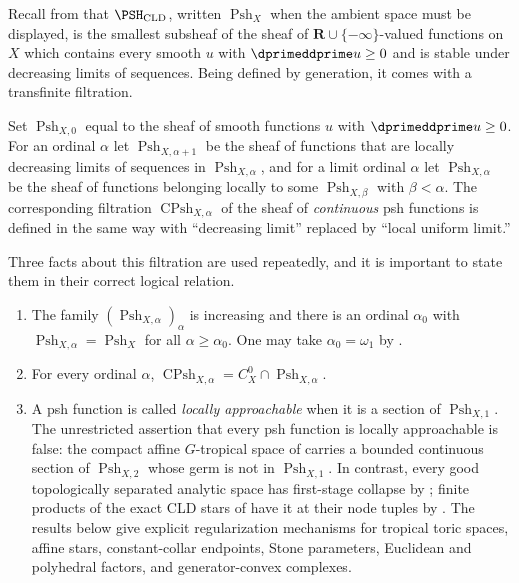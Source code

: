 Recall from  that $\PSH_{\mathrm{CLD}}$,
written $\operatorname{Psh}_X$ when the ambient space must be displayed, is
the smallest subsheaf of the sheaf of $\mathbf R\cup\{-\infty\}$-valued
functions on $X$ which contains every smooth $u$ with
$\dprimeddprime u\geq0$ and is stable under decreasing limits of sequences.
Being defined by generation, it comes with a transfinite filtration.

\begin{definition}
\label{def:ch16-psh-filtration}
Set $\operatorname{Psh}_{X,0}$ equal to the sheaf of smooth functions $u$
with $\dprimeddprime u\geq0$.  For an ordinal $\alpha$ let
$\operatorname{Psh}_{X,\alpha+1}$ be the sheaf of functions that are locally
decreasing limits of sequences in $\operatorname{Psh}_{X,\alpha}$, and for a
limit ordinal $\alpha$ let $\operatorname{Psh}_{X,\alpha}$ be the sheaf of
functions belonging locally to some $\operatorname{Psh}_{X,\beta}$ with
$\beta<\alpha$.  The corresponding filtration
$\operatorname{CPsh}_{X,\alpha}$ of the sheaf of \emph{continuous} psh
functions is defined in the same way with ``decreasing limit'' replaced by
``local uniform limit.''
\end{definition}

Three facts about this filtration are used repeatedly, and it is important
to state them in their correct logical relation.

\begin{proposition}
\label{prop:ch16-hierarchy-status}
\begin{enumerate}
\item\label{itm:ch16-hier:stat}
 The family $(\operatorname{Psh}_{X,\alpha})_\alpha$ is increasing and there
 is an ordinal $\alpha_0$ with
 $\operatorname{Psh}_{X,\alpha}=\operatorname{Psh}_X$ for all
 $\alpha\geq\alpha_0$.  One may take
 $\alpha_0=\omega_1$ by
 .
\item\label{itm:ch16-hier:cont}
 For every ordinal $\alpha$,
 $\operatorname{CPsh}_{X,\alpha}
   =C^0_X\cap\operatorname{Psh}_{X,\alpha}$.
\item\label{itm:ch16-hier:approach}
 A psh function is called \emph{locally approachable} when it is a section
 of $\operatorname{Psh}_{X,1}$.  The unrestricted assertion that every psh
 function is locally approachable is false: the compact affine
 $G$-tropical space of
  carries a bounded continuous
 section of $\operatorname{Psh}_{X,2}$ whose germ is not in
 $\operatorname{Psh}_{X,1}$.  In contrast, every good topologically
 separated analytic space has first-stage collapse by
 ; finite products of the
 exact CLD stars of \cite[\S6.7.3]{CLD25} have it at their node tuples by
 .  The results below give
 explicit regularization mechanisms for tropical toric spaces, affine
 stars, constant-collar endpoints, Stone parameters, Euclidean and
 polyhedral factors, and generator-convex complexes.
\end{enumerate}
\end{proposition}

